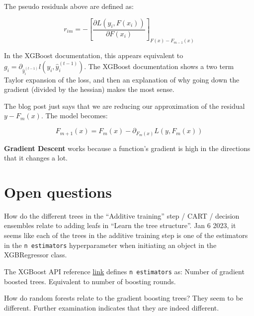 \documentclass[12 pt, leqno]{article}
\begin{document}
The pseudo residuals above are defined as:

$$r_{im} = - \left[ \frac{\partial L(y_i, F(x_i))}{\partial F(x_i)} \right]_{F(x) - F_{m-1} (x)} $$

In the XGBoost documentation, this appears equivalent to $g_i = \partial_{\hat{y}_i^{(t - 1)}} l(y_i, \hat{y}_i^{(t - 1)})$. The XGBoost documentation shows a two term Taylor expansion of the loss, and then an explanation of why going down the gradient (divided by the hessian) makes the most sense.

The blog post just says that we are reducing our approximation of the residual $y - F_m(x)$. The model becomes:

$$F_{m+1}(x) = F_m(x) - \partial_{F_m(x)} L(y, F_m(x)) $$ 

\textbf{Gradient Descent} works because a function's gradient is high in the directions that it changes a lot. 

\section{Open questions}

How do the different trees in the ``Additive training'' step / CART / decision ensembles relate to adding leafs in ``Learn the tree structure''. Jan 6 2023, it seems like each of the trees in the additive training step is one of the estimators in the \texttt{n estimators} hyperparameter when initiating an object in the XGBRegressor class. 

The XGBoost API reference \href{https://xgboost.readthedocs.io/en/stable/python/python_api.html}{link} defines \texttt{n estimators} as: Number of gradient boosted trees. Equivalent to number of boosting rounds.

How do random forests relate to the gradient boosting trees? They seem to be different. Further examination indicates that they are indeed different.
\end{document}

